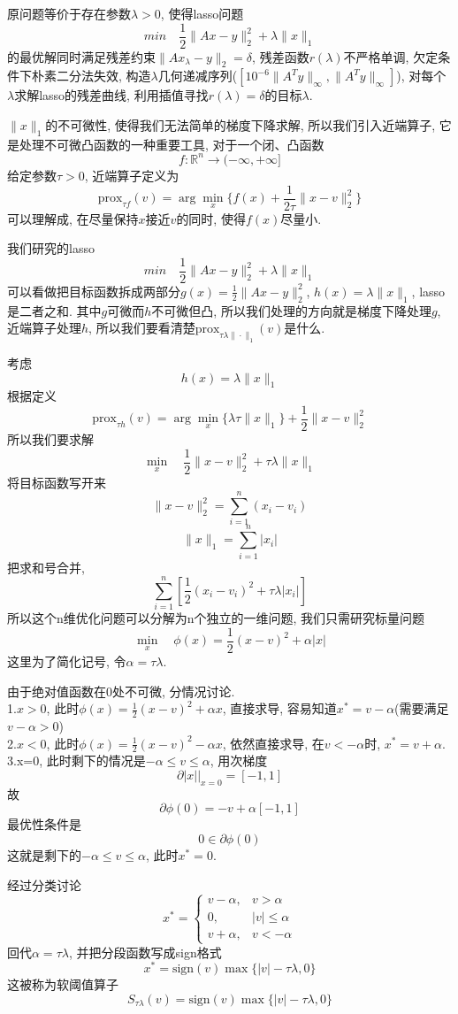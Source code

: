 \documentclass[UTF8]{ctexart}
\theoremstyle{definition}
\theoremstyle{examplestyle}
\theoremstyle{remark}
\begin{document}
原问题等价于存在参数$\lambda>0$, 使得lasso问题
\[min\quad \frac{1}{2}\|Ax-y\|_2^2+\lambda\|x\|_1\]
的最优解同时满足残差约束$\|Ax_\lambda-y\|_2=\delta$, 残差函数$r(\lambda)$不严格单调, 欠定条件下朴素二分法失效, 构造$\lambda$几何递减序列($[10^{-6}\|A^Ty\|_\infty,\|A^Ty\|_\infty]$), 对每个$\lambda$求解lasso的残差曲线, 利用插值寻找$r(\lambda)=\delta$的目标$\lambda$.

$\|x\|_1$的不可微性, 使得我们无法简单的梯度下降求解, 所以我们引入近端算子, 它是处理不可微凸函数的一种重要工具, 对于一个闭、凸函数
\[f:\mathbb{R}^n\to(-\infty,+\infty]\]
给定参数$\tau>0$, 近端算子定义为
\[\text{prox}_{\tau f}(v)=\arg\min_x\{f(x)+\frac{1}{2\tau}\|x-v\|_2^2\}\]
可以理解成, 在尽量保持$x$接近$v$的同时, 使得$f(x)$尽量小.

我们研究的lasso
\[min\quad \frac{1}{2}\|Ax-y\|_2^2+\lambda\|x\|_1\]
可以看做把目标函数拆成两部分$g(x)=\frac{1}{2}\|Ax-y\|_2^2$, $h(x)=\lambda\|x\|_1$, lasso是二者之和. 其中$g$可微而$h$不可微但凸, 所以我们处理的方向就是梯度下降处理$g$, 近端算子处理$h$, 所以我们要看清楚$\text{prox}_{\tau \lambda\|\cdot\|_1}(v)$是什么.

考虑
\[h(x)=\lambda\|x\|_1\]
根据定义
\[\text{prox}_{\tau h}(v)=\arg\min_x\{\lambda\tau\|x\|_1\}+\frac{1}{2}\|x-v\|_2^2\]
所以我们要求解
\[\min_x\quad\frac{1}{2}\|x-v\|_2^2+\tau\lambda\|x\|_1\]
将目标函数写开来
\[\|x-v\|_2^2=\sum_{i=1}^n(x_i-v_i)\]\[\|x\|_1=\sum_{i=1}^n|x_i|\]
把求和号合并,
\[\sum_{i=1}^n[\frac{1}{2}(x_i-v_i)^2+\tau\lambda|x_i|]\]
所以这个n维优化问题可以分解为n个独立的一维问题, 我们只需研究标量问题
\[\min_x\quad\phi(x)=\frac{1}{2}(x-v)^2+\alpha|x|\]
这里为了简化记号, 令$\alpha=\tau\lambda$.

由于绝对值函数在0处不可微, 分情况讨论.\\
1.$x>0$, 此时$\phi(x)=\frac{1}{2}(x-v)^2+\alpha x$, 直接求导, 容易知道$x^*=v-\alpha$(需要满足$v-\alpha>0$)\\
2.$x<0$, 此时$\phi(x)=\frac{1}{2}(x-v)^2-\alpha x$, 依然直接求导, 在$v<-\alpha$时, $x^*=v+\alpha$.\\
3.x=0, 此时剩下的情况是$-\alpha\le v\le\alpha$, 用次梯度
\[\partial |x|\bigg|_{x=0}=[-1,1]\]
故
\[\partial\phi(0)=-v+\alpha[-1,1]\]
最优性条件是
\[0\in\partial\phi(0)\]
这就是剩下的$-\alpha\le v\le\alpha$, 此时$x^*=0$.

经过分类讨论
\[x^*=\begin{cases}
    v-\alpha, &v>\alpha\\
    0, &|v|\le\alpha\\
    v+\alpha, &v<-\alpha
\end{cases}\]
回代$\alpha=\tau\lambda$, 并把分段函数写成sign格式
\[x^*=\text{sign}(v)\max\{|v|-\tau\lambda,0\}\]
这被称为软阈值算子
\[S_{\tau\lambda}(v)=\text{sign}(v)\max\{|v|-\tau\lambda,0\}\]
\end{document}
